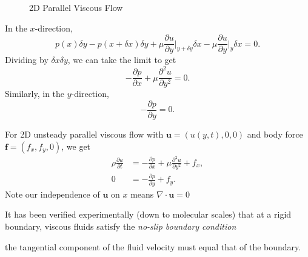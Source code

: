 \documentclass[12pt]{article}
\begin{document}
\begin{figure}[h]
	\centering
	\caption{2D Parallel Viscous Flow}
	\label{fig:2d_viscous_flow}
\end{figure}

In the $x$-direction,
\[
p(x) \delta y - p(x + \delta x)\delta y + \mu \frac{\partial u}{\partial y} \biggr|_{y + \delta y} \delta x - \mu \frac{\partial u}{\partial y}|_y \delta x = 0
.\]
Dividing by $\delta x \delta y$, we can take the limit to get
\[
- \frac{\partial p}{\partial x} + \mu \frac{\partial^2 u}{\partial y^2} = 0
.\]
Similarly, in the $y$-direction,
\[
- \frac{\partial p}{\partial y} = 0
.\]

For 2D unsteady parallel viscous flow with $\mathbf{u} = (u(y, t), 0, 0)$ and body force $\mathbf{f} = (f_x, f_y, 0)$, we get
\begin{align*}
	\rho \frac{\partial u}{\partial t} &= - \frac{\partial p}{\partial x} + \mu \frac{\partial^2 u}{\partial y^2} + f_x, \\
	0 &= - \frac{\partial p}{\partial y} + f_y.
\end{align*}
Note our independence of $\mathbf{u}$ on $x$ means $\nabla \cdot \mathbf{u} = 0$ 

It has been verified experimentally (down to molecular scales) that at a rigid boundary, viscous fluids satisfy the \emph{no-slip boundary condition}
\begin{center}
	the tangential component of the fluid velocity must equal that of the boundary.
\end{center}
\end{document}
